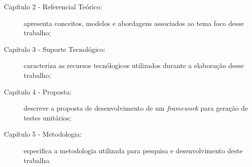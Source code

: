 	\begin{description}
		\item[Capítulo 2 - Referencial Teórico:] apresenta conceitos, modelos e abordagens associados ao tema foco desse trabalho;
		\item[Capítulo 3 - Suporte Tecnológico:] caracteriza as recursos tecnólogicos utilizados durante a elaboração desse trabalho;
		\item[Capítulo 4 - Proposta:] descreve a proposta de desenvolvimento de um \textit{framework} para geração de testes unitários;
		\item[Capítulo 5 - Metodologia:] especifica a metodologia utilizada para pesquisa e desenvolvimento deste trabalho.
	\end{description}